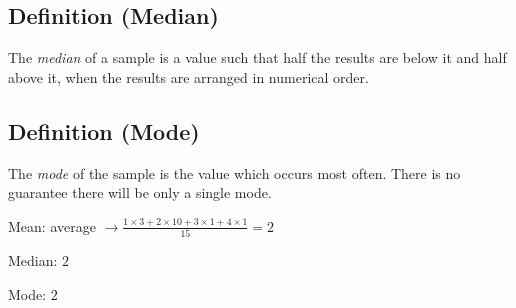 \begin{defbox}
    \subsection{Definition (Median)}
    The \emph{median} of a sample is a value such that half the results are 
    below it and half above it, when the results are arranged in numerical 
    order.
\end{defbox}

\begin{defbox}
    \subsection{Definition (Mode)}
    The \emph{mode} of the sample is the value which occurs most often. There
    is no guarantee there will be only a single mode.
\end{defbox}
Mean: average $ \rightarrow
\frac{1\times 3+2\times 10+3\times 1+4\times 1}{15}=2 $

Median: $ 2 $

Mode: $ 2 $
